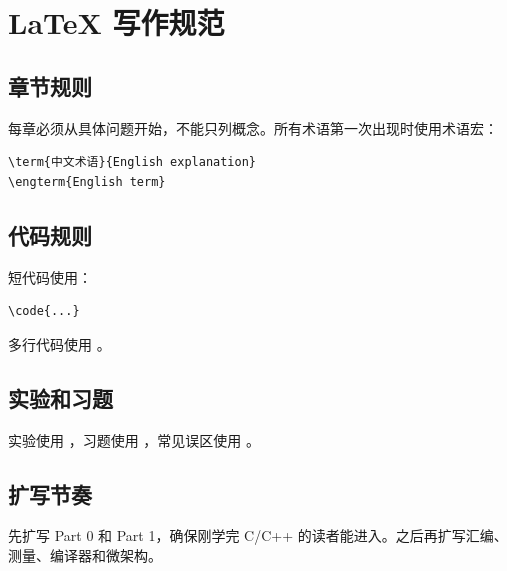\chapter{LaTeX 写作规范}

\section{章节规则}

每章必须从具体问题开始，不能只列概念。所有术语第一次出现时使用术语宏：

\begin{lstlisting}
\term{中文术语}{English explanation}
\engterm{English term}
\end{lstlisting}

\section{代码规则}

短代码使用：

\begin{lstlisting}
\code{...}
\end{lstlisting}

多行代码使用 。

\section{实验和习题}

实验使用 ，习题使用 ，常见误区使用 。

\section{扩写节奏}

先扩写 Part 0 和 Part 1，确保刚学完 C/C++ 的读者能进入。之后再扩写汇编、测量、编译器和微架构。
